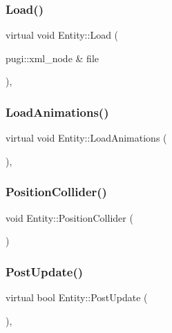 \mbox{\label{class_entity_ad13f6b86a79f8661862587d9b81d54a2}} 
\subsubsection{\texorpdfstring{Load()}{Load()}}
{\footnotesize\ttfamily virtual void Entity\+::\+Load (\begin{DoxyParamCaption}\item[{pugi\+::xml\+\_\+node \&}]{file }\end{DoxyParamCaption})\hspace{0.3cm}{\ttfamily [inline]}, {\ttfamily [virtual]}}

\mbox{\label{class_entity_a4d0f9b582d81ccfdb739796f3d4cca0d}} 
\subsubsection{\texorpdfstring{LoadAnimations()}{LoadAnimations()}}
{\footnotesize\ttfamily virtual void Entity\+::\+Load\+Animations (\begin{DoxyParamCaption}{ }\end{DoxyParamCaption})\hspace{0.3cm}{\ttfamily [inline]}, {\ttfamily [virtual]}}

\mbox{\label{class_entity_a1c2ad92b93d43d021e68421521b80a4c}} 
\subsubsection{\texorpdfstring{PositionCollider()}{PositionCollider()}}
{\footnotesize\ttfamily void Entity\+::\+Position\+Collider (\begin{DoxyParamCaption}{ }\end{DoxyParamCaption})}

\mbox{\label{class_entity_a2a011149934758929cdbf5db65877c76}} 
\subsubsection{\texorpdfstring{PostUpdate()}{PostUpdate()}}
{\footnotesize\ttfamily virtual bool Entity\+::\+Post\+Update (\begin{DoxyParamCaption}{ }\end{DoxyParamCaption})\hspace{0.3cm}{\ttfamily [inline]}, {\ttfamily [virtual]}}

